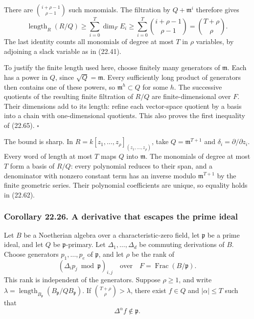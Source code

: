 \documentclass[
  11pt,
  a4paper,
]{article}
\begin{document}
There are \(\binom{i+\rho-1}{\rho-1}\) such monomials. The filtration by
\(Q+\mathfrak m^i\) therefore gives \[
 \operatorname{length}_R(R/Q)
 \ge\sum_{i=0}^T\dim_F E_i
 \ge\sum_{i=0}^T\binom{i+\rho-1}{\rho-1}
 =\binom{T+\rho}{\rho}.
 \tag{22.65}
\] The last identity counts all monomials of degree at most \(T\) in
\(\rho\) variables, by adjoining a slack variable as in (22.41).

To justify the finite length used here, choose finitely many generators
of \(\mathfrak m\). Each has a power in \(Q\), since
\(\sqrt Q=\mathfrak m\). Every sufficiently long product of generators
then contains one of these powers, so \(\mathfrak m^h\subset Q\) for
some \(h\). The successive quotients of the resulting finite filtration
of \(R/Q\) are finite-dimensional over \(F\). Their dimensions add to
its length: refine each vector-space quotient by a basis into a chain
with one-dimensional quotients. This also proves the first inequality of
(22.65). \(\square\)

The bound is sharp. In \(R=k[z_1,\ldots,z_\rho]_{(z_1,\ldots,z_\rho)}\),
take \(Q=\mathfrak m^{T+1}\) and \(\delta_i=\partial/\partial z_i\).
Every word of length at most \(T\) maps \(Q\) into \(\mathfrak m\). The
monomials of degree at most \(T\) form a basis of \(R/Q\): every
polynomial reduces to their span, and a denominator with nonzero
constant term has an inverse modulo \(\mathfrak m^{T+1}\) by the finite
geometric series. Their polynomial coefficients are unique, so equality
holds in (22.62).

\subsubsection{Corollary 22.26. A derivative that escapes the prime
ideal}\label{corollary-22.26.-a-derivative-that-escapes-the-prime-ideal}

Let \(B\) be a Noetherian algebra over a characteristic-zero field, let
\(\mathfrak p\) be a prime ideal, and let \(Q\) be
\(\mathfrak p\)-primary. Let \(\Delta_1,\ldots,\Delta_d\) be commuting
derivations of \(B\). Choose generators \(p_1,\ldots,p_e\) of
\(\mathfrak p\), and let \(\rho\) be the rank of \[
 (\Delta_i p_j\bmod\mathfrak p)_{i,j}
 \quad\text{over}\quad F=\operatorname{Frac}(B/\mathfrak p).
 \tag{22.66}
\] This rank is independent of the generators. Suppose \(\rho\ge1\), and
write
\(\lambda=\operatorname{length}_{B_{\mathfrak p}}(B_{\mathfrak p}/QB_{\mathfrak p})\).
If \(\binom{T+\rho}{\rho}>\lambda\), there exist \(f\in Q\) and
\(|\alpha|\le T\) such that \[
 \Delta^\alpha f\notin\mathfrak p.
 \tag{22.67}
\]
\end{document}
